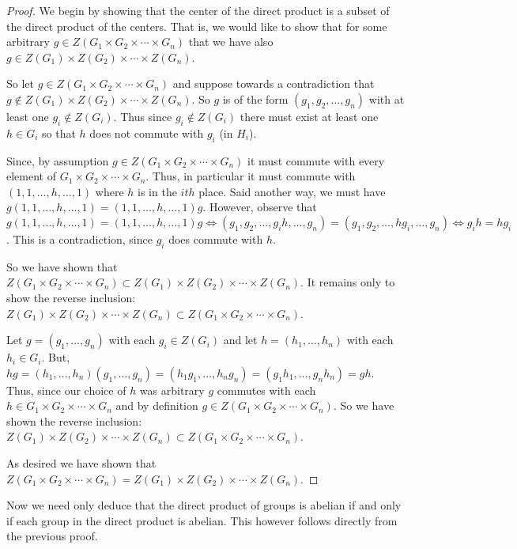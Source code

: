 \documentclass[12pt]{article}
\begin{document}
\begin{proof}We begin by showing that the center of the direct product is a  subset of the direct product of the centers. That is, we would like to show that for some arbitrary $g\in Z(G_1 \times G_2 \times \cdots \times G_n)$ that we have also $g \in  Z(G_1) \times Z(G_2) \times \cdots \times Z(G_n)$.

So let $g\in Z(G_1 \times G_2 \times \cdots \times G_n)$ and suppose towards a contradiction that $g \notin  Z(G_1) \times Z(G_2) \times \cdots \times Z(G_n)$. So $g$ is of the form $(g_1,g_2, \dots, g_n)$ with at least one $g_i\notin Z(G_i)$. Thus since $g_i\notin Z(G_i)$ there must exist at least one $h\in G_i$ so that $h$ does not commute with $g_i$ (in $H_i$). 

Since, by assumption $g\in Z(G_1 \times G_2 \times \cdots \times G_n)$ it must commute with every element of $G_1 \times G_2 \times \cdots \times G_n$. Thus, in particular it must commute with $(1,1,\dots,h,\dots,1)$ where $h$ is in the $ith$ place. Said another way, we must have $g(1,1,\dots,h,\dots,1)=(1,1,\dots,h,\dots,1)g$. However, observe that $g(1,1,\dots,h,\dots,1)=(1,1,\dots,h,\dots,1)g \Leftrightarrow (g_1,g_2, \dots,g_i h,\dots, g_n) = (g_1,g_2, \dots, h g_i,\dots, g_n) \Leftrightarrow g_i h = h g_i$. This is a contradiction, since $g_i$ does commute with $h$. 

So we have shown that $Z(G_1 \times G_2 \times \cdots \times G_n) \subset Z(G_1) \times Z(G_2) \times \cdots \times Z(G_n)$. It remains only to show the reverse inclusion: $ Z(G_1) \times Z(G_2) \times \cdots \times Z(G_n) \subset Z(G_1 \times G_2 \times \cdots \times G_n) $. 

Let $g=(g_1, \dots , g_n)$ with each $g_i \in Z(G_i)$ and let $h=(h_1, \dots , h_n)$ with each $h_i \in G_i$. But, $h g = (h_1, \dots , h_n) (g_1, \dots , g_n) = ( h_1 g_1, \dots , h_n g_n) = ( g_1 h_1, \dots , g_n h_n) = g h $. Thus, since our choice of $h$ was arbitrary $g$ commutes with each $h \in G_1 \times G_2 \times \cdots \times G_n$ and by definition $g \in Z(G_1 \times G_2 \times \cdots \times G_n) $. So we have shown the reverse inclusion: $ Z(G_1) \times Z(G_2) \times \cdots \times Z(G_n) \subset Z(G_1 \times G_2 \times \cdots \times G_n) $.

As desired we have shown that $Z(G_1 \times G_2 \times \cdots \times G_n) = Z(G_1) \times Z(G_2) \times \cdots \times Z(G_n)$. \end{proof}

Now we need only deduce that the direct product of groups is abelian if and only if each group in the direct product is abelian. This however follows directly from the previous proof. 
\end{document}
